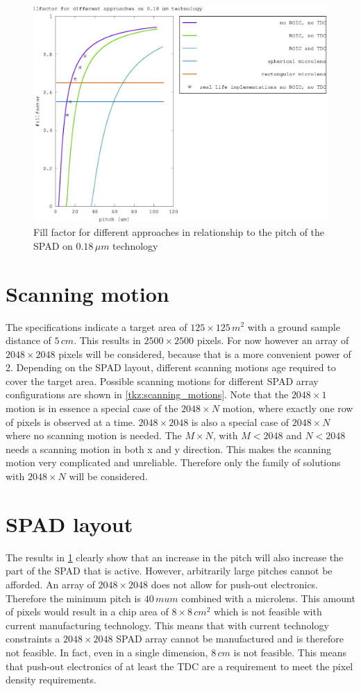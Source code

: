 \begin{figure}[h]
\centering
	\includegraphics[width=0.8\linewidth]{fig/effective_area.eps}
\caption{Fill factor for different approaches in relationship to the pitch of the SPAD on $0.18\,\mu m$ technology}
\label{fig:effective_area}
\end{figure} 

\section{Scanning motion}\label{ssec:scanning_motion}
The specifications indicate a target area of $125\times125\,m^2$ with a ground sample distance of $5\,cm$. This results in $2500\times2500$ pixels. For now however an array of $2048\times2048$ pixels will be considered, because that is a more convenient power of 2. 
Depending on the SPAD layout, different scanning motions age required to cover the target area. Possible scanning motions for different SPAD array configurations are shown in \cref{tkz:scanning_motions}. Note that the $2048\times1$ motion is in essence a special case of the $2048\times N$ motion, where exactly one row of pixels is observed at a time. $2048\times2048$ is also a special case of $2048\times N$ where no scanning motion is needed. The $M\times N$, with $M<2048$ and $N<2048$ needs a scanning motion in both x and y direction. This makes the scanning motion very complicated and unreliable. Therefore only the family of solutions with $2048\times N$ will be considered.



\section{SPAD layout}\label{ssec:SPAD_layout}
The results in \cref{fig:effective_area} clearly show that an increase in the pitch will also increase the part of the SPAD that is active. However, arbitrarily large pitches cannot be afforded. An array of $2048\times2048$ does not allow for push-out electronics. Therefore the minimum pitch is $40\,mu m$ combined with a microlens. This amount of pixels would result in a chip area of $8\times8\,cm^2$ which is not feasible with current manufacturing technology. This means that with current technology constraints a $2048\times2048$ SPAD array cannot be manufactured and is therefore not feasible. In fact, even in a single dimension, $8\,cm$ is not feasible. This means that push-out electronics of at least the TDC are a requirement to meet the pixel density requirements.


